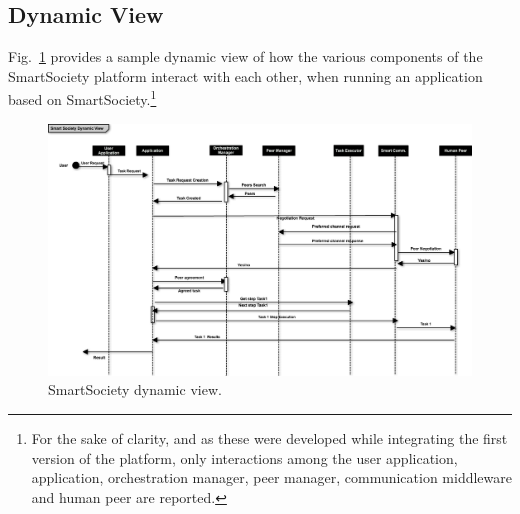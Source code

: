 \subsection{Dynamic View}
Fig.~\ref{fig:dynamic_view} provides a sample dynamic view of how the various components of the SmartSociety platform interact with each other, when running an application based on SmartSociety.\footnote{For the sake of clarity, and as these were developed while integrating the first version of the platform, only interactions among the user application, application, orchestration manager, peer manager, communication middleware and human peer are reported.} 

\begin{figure}[!hbt]
 \centering
 \includegraphics[width=1\textwidth]{figs/dynamicViewTemplate}
 \caption{SmartSociety dynamic view.}
 \label{fig:dynamic_view}
\end{figure}

